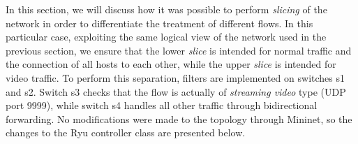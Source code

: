 In this section, we will discuss how it was possible to perform \textit{slicing} of the network in order to differentiate the treatment of different flows. In this particular case, exploiting the same logical view of the network used in the previous section, we ensure that the lower \textit{slice} is intended for normal traffic and the connection of all hosts to each other, while the upper \textit{slice} is intended for video traffic.
To perform this separation, filters are implemented on switches s1 and s2. Switch s3 checks that the flow is actually of \textit{streaming video} type (UDP port 9999), while switch s4 handles all other traffic through bidirectional forwarding.
No modifications were made to the topology through Mininet, so the changes to the Ryu controller class are presented below.

\vspace{.3cm}


